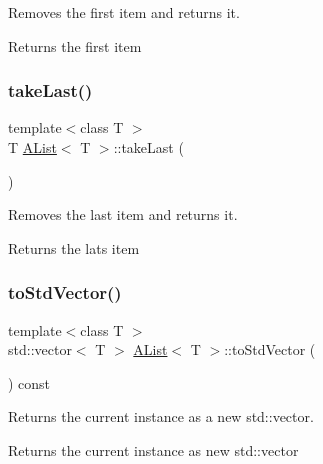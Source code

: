 Removes the first item and returns it. 

\begin{DoxyReturn}{Returns}
the first item 
\end{DoxyReturn}
\mbox{\label{class_a_list_aa210fddef3bf64dd63dd68f3d5f2fe05}} 
\subsubsection{\texorpdfstring{takeLast()}{takeLast()}}
{\footnotesize\ttfamily template$<$class T $>$ \\
T \mbox{\hyperlink{class_a_list}{A\+List}}$<$ T $>$\+::take\+Last (\begin{DoxyParamCaption}{ }\end{DoxyParamCaption})}



Removes the last item and returns it. 

\begin{DoxyReturn}{Returns}
the lats item 
\end{DoxyReturn}
\mbox{\label{class_a_list_a53cbab789aed68750822a67ee6ae4d13}} 
\subsubsection{\texorpdfstring{toStdVector()}{toStdVector()}}
{\footnotesize\ttfamily template$<$class T $>$ \\
std\+::vector$<$ T $>$ \mbox{\hyperlink{class_a_list}{A\+List}}$<$ T $>$\+::to\+Std\+Vector (\begin{DoxyParamCaption}{ }\end{DoxyParamCaption}) const}



Returns the current instance as a new std\+::vector. 

\begin{DoxyReturn}{Returns}
the current instance as new std\+::vector 
\end{DoxyReturn}
\mbox{\label{class_a_list_a7be198818f6459df77cdc29a2f8d8d5e}} 
